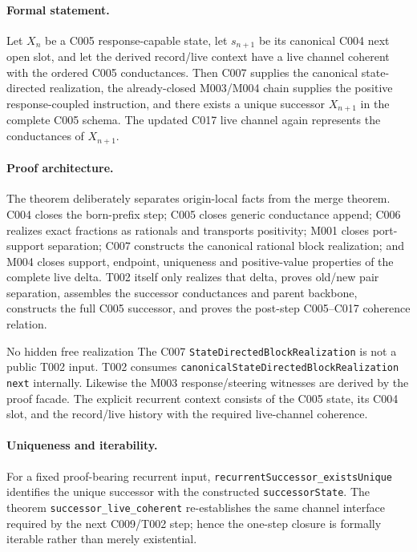
\paragraph*{Formal statement.}
Let $X_n$ be a C005 response-capable state, let $s_{n+1}$ be its canonical
C004 next open slot, and let the derived record/live context have a live
channel coherent with the ordered C005 conductances.  Then C007 supplies the
canonical state-directed realization, the already-closed M003/M004 chain
supplies the positive response-coupled instruction, and there exists a unique
successor $X_{n+1}$ in the complete C005 schema.  The updated C017 live channel
again represents the conductances of $X_{n+1}$.

\paragraph*{Proof architecture.}
The theorem deliberately separates origin-local facts from the merge theorem.
C004 closes the born-prefix step; C005 closes generic conductance append;
C006 realizes exact fractions as rationals and transports positivity; M001
closes port-support separation; C007 constructs the canonical rational block
realization; and M004 closes support, endpoint, uniqueness and positive-value
properties of the complete live delta.  T002 itself only realizes that delta,
proves old/new pair separation, assembles the successor conductances and
parent backbone, constructs the full C005 successor, and proves the post-step
C005--C017 coherence relation.

\begin{cnnaInfoBox}{No hidden free realization}
The C007 \texttt{StateDirectedBlockRealization} is not a public T002 input.
T002 consumes \texttt{canonicalStateDirectedBlockRealization next} internally.
Likewise the M003 response/steering witnesses are derived by the proof facade.
The explicit recurrent context consists of the C005 state, its C004 slot, and
the record/live history with the required live-channel coherence.
\end{cnnaInfoBox}

\paragraph*{Uniqueness and iterability.}
For a fixed proof-bearing recurrent input, \texttt{recurrentSuccessor\_existsUnique}
identifies the unique successor with the constructed \texttt{successorState}.
The theorem \texttt{successor\_live\_coherent} re-establishes the same channel
interface required by the next C009/T002 step; hence the one-step closure is
formally iterable rather than merely existential.

